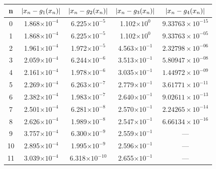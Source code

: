 \begin{solution}
\begin{table}[H]
	\centering
	\begin{tabular}[H]{c|c|c|c|c}
		\hline
		n  & $ \lvert x_n - g_1(x_n) \rvert $ & $ \lvert x_n - g_2(x_n) \rvert $ & $ \lvert x_n - g_3(x_n) \rvert $ & $ \lvert x_n - g_4(x_n) \rvert $ \\
		\hline
		0  & 1.868$\times10^{-4}$     & 6.225$\times10^{-5}$     & 1.102$\times10^{0}$      & $9.33763\times10^{-15}$
		\\
		1  & 1.868$\times10^{-4}$     & 6.225$\times10^{-5}$     & 1.102$\times10^{0}$      & $9.33763\times10^{-05}$
		\\
		2  & 1.961$\times10^{-4}$     & 1.972$\times10^{-5}$     & 4.563$\times10^{-1}$     & $2.32798\times10^{-06}$
		\\
		3  & 2.059$\times10^{-4}$     & 6.244$\times10^{-6}$     & 3.513$\times10^{-1}$     & $5.80947\times10^{-08}$
		\\
		4  & 2.161$\times10^{-4}$     & 1.978$\times10^{-6}$     & 3.035$\times10^{-1}$     & $1.44972\times10^{-09}$
		\\
		5  & 2.269$\times10^{-4}$     & 6.263$\times10^{-7}$     & 2.779$\times10^{-1}$     & $3.61771\times10^{-11}$
		\\
		6  & 2.382$\times10^{-4}$     & 1.983$\times10^{-7}$     & 2.640$\times10^{-1}$     & $9.02611\times10^{-13}$
		\\
		7  & 2.501$\times10^{-4}$     & 6.281$\times10^{-8}$     & 2.570$\times10^{-1}$     & $2.24265\times10^{-14}$
		\\
		8  & 2.626$\times10^{-4}$     & 1.989$\times10^{-8}$     & 2.547$\times10^{-1}$     & $6.66134\times10^{-16}$  \\
		9  & 3.757$\times10^{-4}$     & 6.300$\times10^{-9}$     & 2.559$\times10^{-1}$     & ---                      \\
		10 & 2.895$\times10^{-4}$     & 1.995$\times10^{-9}$     & 2.596$\times10^{-1}$     & ---                      \\
		11 & 3.039$\times10^{-4}$     & 6.318$\times10^{-10}$    & 2.655$\times10^{-1}$     & ---                      \\
	\end{tabular}
	\caption{}\label{tab:}
\end{table}

\end{solution}


